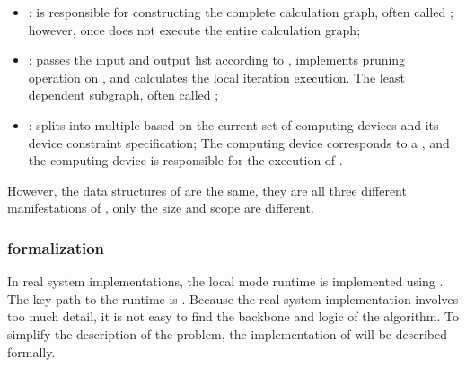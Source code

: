 \begin{content}
\begin{itemize}
  \item {}:  is responsible for constructing the complete calculation graph, often called ; however, once  does not execute the entire calculation graph;
  \item {}:  passes the  input and output list according to , implements pruning operation on , and calculates the local iteration execution. The least dependent subgraph, often called ;
  \item {}:  splits  into multiple  based on the current set of computing devices and its  device constraint specification; The computing device corresponds to a , and the computing device is responsible for the execution of .
\end{itemize}

However, the data structures of  are the same, they are all three different manifestations of , only the size and scope are different.

\subsubsection{formalization}

In real system implementations, the local mode runtime is implemented using . The key path to the \tf{} runtime is . Because the real system implementation involves too much detail, it is not easy to find the backbone and logic of the algorithm. To simplify the description of the problem, the implementation of  will be described formally.



\end{content}

